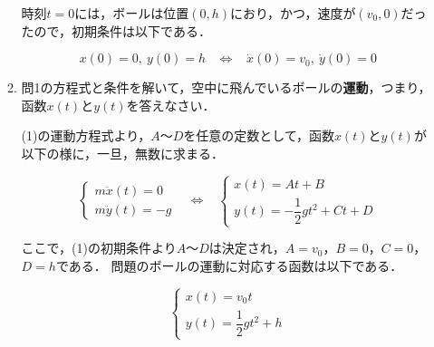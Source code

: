 \documentclass[a4paper,11pt]{ltjsarticle}
\begin{document}
\begin{enumerate}
\begin{enumerate}[label=(\arabic*)]
        時刻$t=0$には，ボールは位置$(0,h)$におり，かつ，速度が$(v_0,0)$だったので，初期条件は以下である．

        \begin{equation*}
            x(0)=0,\ y(0)=h  \hspace{10pt} \Leftrightarrow \hspace{10pt}
            \dot{x}(0)=v_0,\ \dot{y}(0)=0
        \end{equation*}

        \vspace{5pt}

        \item 問1の方程式と条件を解いて，空中に飛んでいるボールの\textbf{運動}，つまり，函数$x(t)$と$y(t)$を答えなさい．
        
        \vspace{5pt}

        (1)の運動方程式より，$A$～$D$を任意の定数として，函数$x(t)$と$y(t)$が以下の様に，一旦，無数に求まる．

        \begin{equation*}
            \begin{cases}
                m \ddot{x}(t)=0 \\
                m \ddot{y}(t)=-g
            \end{cases}
            \hspace{10pt} \Leftrightarrow \hspace{10pt}
            \begin{cases}
                x(t)=At+B \\
                y(t)=-\dfrac{1}{2}gt^2+Ct+D
            \end{cases}
        \end{equation*}

        \clearpage

        ここで，(1)の初期条件より$A$～$D$は決定され，$A=v_0$，$B=0$，$C=0$，$D=h$である．
        問題のボールの運動に対応する函数は以下である．

        \begin{equation*}
            \begin{cases}
                x(t)=v_0t \\
                y(t)= \dfrac{1}{2}gt^2+h
            \end{cases}
        \end{equation*}

        \vspace{5pt}


\end{enumerate}
\end{enumerate}
\end{document}
